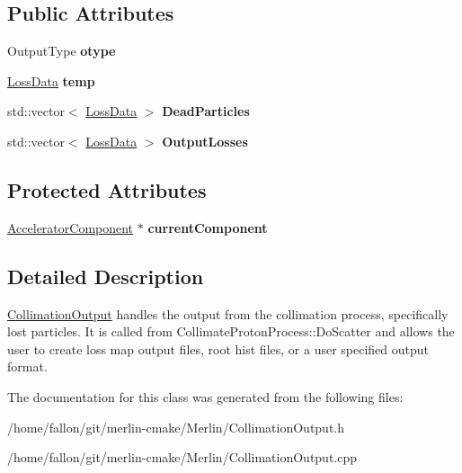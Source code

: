 \subsection*{Public Attributes}
\begin{DoxyCompactItemize}
\item 
\mbox{\label{classParticleTracking_1_1CollimationOutput_a93800f83f3cb5f670f8be5f3d81ade41}} 
Output\+Type {\bfseries otype}
\item 
\mbox{\label{classParticleTracking_1_1CollimationOutput_a5862c5673daf1373dedd1c08a76692ee}} 
\hyperlink{structParticleTracking_1_1LossData}{Loss\+Data} {\bfseries temp}
\item 
\mbox{\label{classParticleTracking_1_1CollimationOutput_a1f881bfef9b1a6eda0a804be14ae8d70}} 
std\+::vector$<$ \hyperlink{structParticleTracking_1_1LossData}{Loss\+Data} $>$ {\bfseries Dead\+Particles}
\item 
\mbox{\label{classParticleTracking_1_1CollimationOutput_af373054ef09844f2926ab59c0d3a8be5}} 
std\+::vector$<$ \hyperlink{structParticleTracking_1_1LossData}{Loss\+Data} $>$ {\bfseries Output\+Losses}
\end{DoxyCompactItemize}
\subsection*{Protected Attributes}
\begin{DoxyCompactItemize}
\item 
\mbox{\label{classParticleTracking_1_1CollimationOutput_aa592d3da5fe8ffe8abc05b1e473b92d6}} 
\hyperlink{classAcceleratorComponent}{Accelerator\+Component} $\ast$ {\bfseries current\+Component}
\end{DoxyCompactItemize}


\subsection{Detailed Description}
\hyperlink{classParticleTracking_1_1CollimationOutput}{Collimation\+Output} handles the output from the collimation process, specifically lost particles. It is called from Collimate\+Proton\+Process\+::\+Do\+Scatter and allows the user to create loss map output files, root hist files, or a user specified output format. 

The documentation for this class was generated from the following files\+:\begin{DoxyCompactItemize}
\item 
/home/fallon/git/merlin-\/cmake/\+Merlin/Collimation\+Output.\+h\item 
/home/fallon/git/merlin-\/cmake/\+Merlin/Collimation\+Output.\+cpp\end{DoxyCompactItemize}
